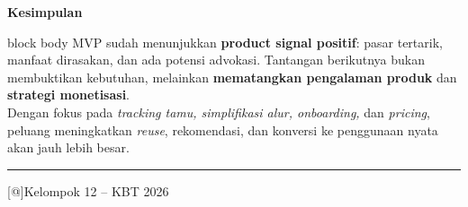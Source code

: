 \documentclass[aspectratio=169]{beamer}
\makeatletter
\newcommand{\faEnvelope}{[@]}
\makeatother
\begin{document}
{
\begin{frame}[plain]
  \vspace{1cm}
  \begin{center}
    {\Large\bfseries\color{white} Kesimpulan}\par
    \vspace{0.6cm}
    \begin{beamercolorbox}[center,wd=0.88\textwidth,rounded=true,shadow=true]{block body}
      \vspace{0.3cm}
      \small MVP sudah menunjukkan \textbf{product signal positif}: pasar tertarik, manfaat dirasakan,
      dan ada potensi advokasi. Tantangan berikutnya bukan membuktikan kebutuhan, melainkan
      \textbf{mematangkan pengalaman produk} dan \textbf{strategi monetisasi}.\\[6pt]
      Dengan fokus pada \textit{tracking tamu, simplifikasi alur, onboarding,} dan \textit{pricing},
      peluang meningkatkan \textit{reuse}, rekomendasi, dan konversi ke penggunaan nyata akan
      jauh lebih besar.
      \vspace{0.3cm}
    \end{beamercolorbox}
    \vspace{0.7cm}
    {\color{light}\rule{0.5\textwidth}{0.4pt}}\par
    \vspace{0.4cm}
    {\color{light}\small \faEnvelope\quad Kelompok 12 -- KBT 2026}\par
  \end{center}
\end{frame}
}
\end{document}
